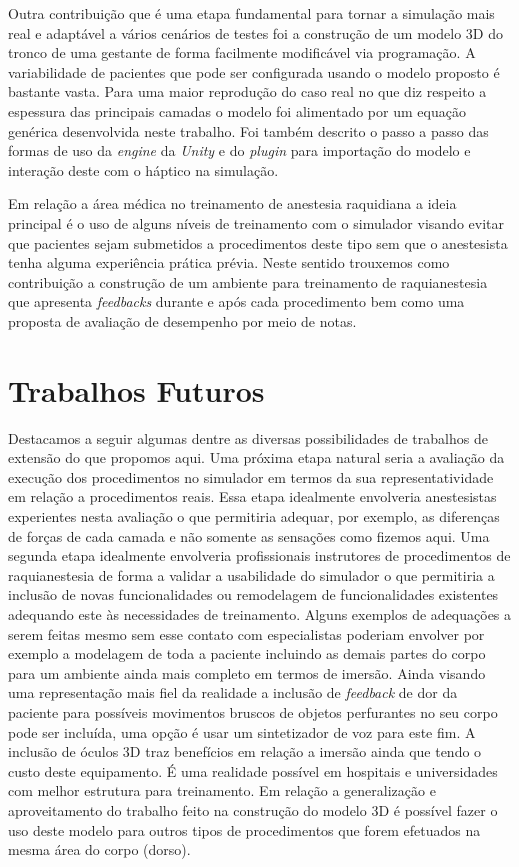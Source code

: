 Outra contribuição que é uma etapa fundamental para tornar a simulação mais real e adaptável a vários cenários de testes foi a construção de um modelo 3D do tronco de uma gestante de forma facilmente modificável via programação. A variabilidade de pacientes que pode ser configurada usando o modelo proposto é bastante vasta. Para uma maior reprodução do caso real no que diz respeito a espessura das principais camadas o modelo foi alimentado por um equação genérica desenvolvida neste trabalho. Foi também descrito o passo a passo das formas de uso da \textit{engine} da \textit{Unity} e do \textit{plugin} para importação do modelo e interação deste com o háptico na simulação. 

Em relação a área médica no treinamento de anestesia raquidiana a ideia principal é o uso de alguns níveis de treinamento com o simulador visando evitar que pacientes sejam submetidos a procedimentos deste tipo sem que o anestesista tenha alguma experiência prática prévia. Neste sentido trouxemos como contribuição a construção de um ambiente para treinamento de raquianestesia que apresenta \textit{feedbacks} durante e após cada procedimento bem como uma proposta de avaliação de desempenho por meio de notas. 

\section{Trabalhos Futuros}
\label{sec:trabFuturo}

Destacamos a seguir algumas dentre as diversas possibilidades de trabalhos de extensão do que propomos aqui. Uma próxima etapa natural seria a avaliação da execução dos procedimentos no simulador em termos da sua representatividade em relação a procedimentos reais. Essa etapa idealmente envolveria anestesistas experientes nesta avaliação o que permitiria adequar, por exemplo, as diferenças de forças de cada camada e não somente as sensações como fizemos aqui. Uma segunda etapa idealmente envolveria profissionais instrutores de procedimentos de raquianestesia de forma a validar a usabilidade do simulador o que permitiria a inclusão de novas funcionalidades ou remodelagem de funcionalidades existentes adequando este às necessidades de treinamento. Alguns exemplos de adequações a serem feitas mesmo sem esse contato com especialistas poderiam envolver por exemplo a modelagem de toda a paciente incluindo as demais partes do corpo para um ambiente ainda mais completo em termos de imersão. Ainda visando uma representação mais fiel da realidade a inclusão de \textit{feedback} de dor da paciente para possíveis movimentos bruscos de objetos perfurantes no seu corpo pode ser incluída, uma opção é usar um sintetizador de voz para este fim. A inclusão de óculos 3D traz benefícios em relação a imersão ainda que tendo o custo deste equipamento. É uma realidade possível em hospitais e universidades com melhor estrutura para treinamento.
Em relação a generalização e aproveitamento do trabalho feito na construção do modelo 3D é possível fazer o uso deste modelo para outros tipos de procedimentos que forem efetuados na mesma área do corpo (dorso). 

